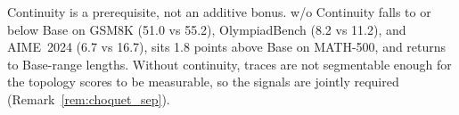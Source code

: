 

Continuity is a prerequisite, not an additive bonus. w/o Continuity falls to or below Base on GSM8K (51.0 vs 55.2), OlympiadBench (8.2 vs 11.2), and AIME~2024 (6.7 vs 16.7), sits 1.8 points above Base on MATH-500, and returns to Base-range lengths. Without continuity, traces are not segmentable enough for the topology scores to be measurable, so the signals are jointly required (Remark~\ref{rem:choquet_sep}).

